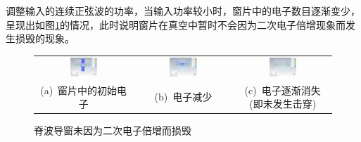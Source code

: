 \documentclass[master]{thesis-uestc}
\begin{document}
调整输入的连续正弦波的功率，当输入功率较小时，窗片中的电子数目逐渐变少，呈现出如图\ref{fig:X频段窗电子逐渐变少}的情况，此时说明窗片在真空中暂时不会因为二次电子倍增现象而发生损毁的现象。
\begin{figure}[!htb]
    \small
    \centering
    \begin{tabular}{@{\ }c@{\ }c@{\ }c}
        \includegraphics[width=0.3\textwidth]{pic/chapter3/XPIC初始电子位置.png} & 
        \hspace{5pt}
        \includegraphics[width=0.3\textwidth]{pic/chapter3/XPIC电子逐渐消散.png}&
        \hspace{5pt}
        \includegraphics[width=0.3\textwidth]{pic/chapter3/XPIC电子完全消散.png}      \\
        \mbox{\small (a) 窗片中的初始电子}                                                                               & 
        \mbox{\small (b) 电子减少} & 
        \mbox{\small (c) 电子逐渐消失(即未发生击穿)}                                                                                  \\
    \end{tabular}
    \caption{脊波导窗未因为二次电子倍增而损毁}
    \label{fig:X频段窗电子逐渐变少}
\end{figure}
\end{document}
